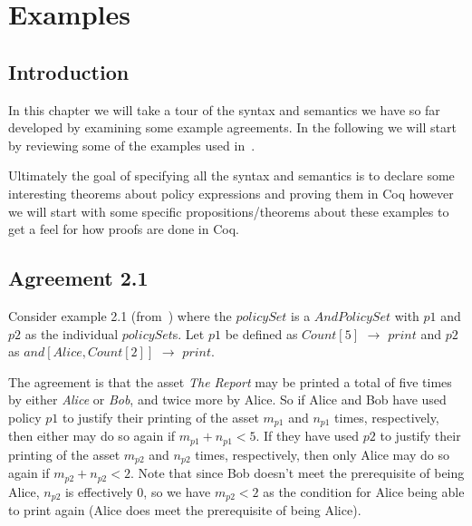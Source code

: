 \chapter{Examples}\label{chap:examples}


\section{Introduction}


In this chapter we will take a tour of the syntax and semantics we have so far developed by examining some example agreements. In the following we will start by reviewing some of the examples used in~\cite{pucella2006}.

Ultimately the goal of specifying all the syntax and semantics is to declare some interesting theorems about policy expressions and proving them in Coq however we will start with some specific propositions/theorems about these examples to get a feel for how proofs are done in Coq.

\section{Agreement 2.1}

Consider example 2.1 (from~\cite{pucella2006}) where the $policySet$ is a $AndPolicySet$ with $p1$ and $p2$ as the individual $policySet$s. Let $p1$ be defined as $Count[5]$ $\rightarrow$ $print$ and $p2$ as $and[Alice, Count[2]]$ $\rightarrow$ $print$. 

The agreement is that the asset \emph{The Report} may be printed a total of five times by either \emph{Alice} or \emph{Bob}, and twice more by Alice. So if Alice and Bob have used policy $p1$ to justify their printing of the asset $m_{p1}$ and $n_{p1}$ times, respectively, then either may do so again if $m_{p1} + n_{p1} < 5$. If they have used $p2$ to justify their printing of the asset $m_{p2}$ and $n_{p2}$ times, respectively, then only Alice may do so again if $m_{p2} + n_{p2} < 2$. Note that since Bob doesn't meet the prerequisite of being Alice, $n_{p2}$ is effectively $0$, so we have $m_{p2} < 2$ as the condition for Alice being able to print again (Alice does meet the prerequisite of being Alice).

